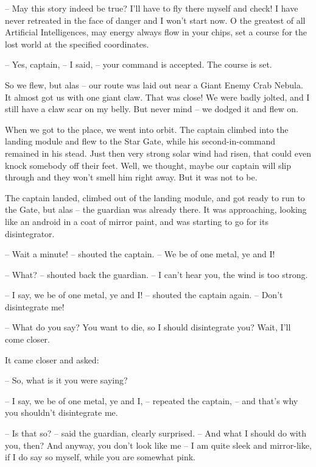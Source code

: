 \documentclass[ebook,oneside,final,openright]{memoir}
\begin{document}
– May this story indeed be true? I’ll have to fly there myself and check! I have never retreated in the face of danger and I won’t start now. O the greatest of all Artificial Intelligences, may energy always flow in your chips, set a course for the lost world at the specified coordinates.\par
– Yes, captain, – I said, – your command is accepted. The course is set.\par
So we flew, but alas – our route was laid out near a Giant Enemy Crab Nebula. It almost got us with one giant claw. That was close! We were badly jolted, and I still have a claw scar on my belly. But never mind – we dodged it and flew on. \par
\par
When we got to the place, we went into orbit. The captain climbed into the landing module and flew to the Star Gate, while his second-in-command remained in his stead. Just then very strong solar wind had risen, that could even knock somebody off their feet. Well, we thought, maybe our captain will slip through and they won’t smell him right away. But it was not to be.\par
\par
The captain landed, climbed out of the landing module, and got ready to run to the Gate, but alas – the guardian was already there. It was approaching, looking like an android in a coat of mirror paint, and was starting to go for its disintegrator.\par
– Wait a minute! – shouted the captain. – We be of one metal, ye and I!\par
– What? – shouted back the guardian. – I can’t hear you, the wind is too strong.\par
– I say, we be of one metal, ye and I! – shouted the captain again. – Don’t disintegrate me!\par
– What do you say? You want to die, so I should disintegrate you? Wait, I’ll come closer.\par
\par
It came closer and asked:\par
– So, what is it you were saying?\par
– I say, we be of one metal, ye and I, – repeated the captain, – and that’s why you shouldn’t disintegrate me.\par
– Is that so? – said the guardian, clearly surprised. – And what I should do with you, then? And anyway, you don’t look like me – I am quite sleek and mirror-like, if I do say so myself, while you are somewhat pink.\par
\end{document}
